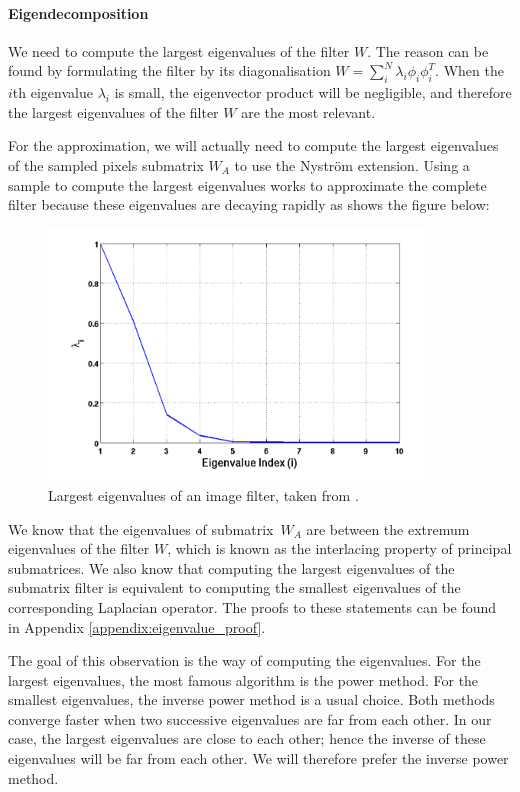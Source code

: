 \paragraph{Eigendecomposition}
We need to compute the largest eigenvalues of the filter \(W\).
The reason can be found by formulating the filter by its diagonalisation \(W = \sum_i^N \lambda_i \phi_i \phi_i^T\).
When the \(i\)th eigenvalue \(\lambda_i\) is small, the eigenvector product will be negligible, and therefore the largest eigenvalues of the filter \(W\) are the most relevant.

For the approximation, we will actually need to compute the largest eigenvalues of the sampled pixels submatrix \(W_A\) to use the Nystr\"om extension.
Using a sample to compute the largest eigenvalues works to approximate the complete filter because these eigenvalues are decaying rapidly as shows the figure below:
\begin{figure}[H]
  \centering
  \includegraphics[width=0.9\textwidth]{img/decayingEigenvalues.png}
  \caption{Largest eigenvalues of an image filter, taken from \cite{siam_slides_2016}.}
\end{figure}

We know that the eigenvalues of submatrix\ \(W_A\) are between the extremum eigenvalues of the filter \(W\), which is known as the interlacing property of principal submatrices.
We also know that computing the largest eigenvalues of the submatrix filter is equivalent to computing the smallest eigenvalues of the corresponding Laplacian operator.
The proofs to these statements can be found in Appendix \ref{appendix:eigenvalue_proof}.

The goal of this observation is the way of computing the eigenvalues.
For the largest eigenvalues, the most famous algorithm is the power method.
For the smallest eigenvalues, the inverse power method is a usual choice.
Both methods converge faster when two successive eigenvalues are far from each other.
In our case, the largest eigenvalues are close to each other; hence the inverse of these eigenvalues will be far from each other.
We will therefore prefer the inverse power method.

